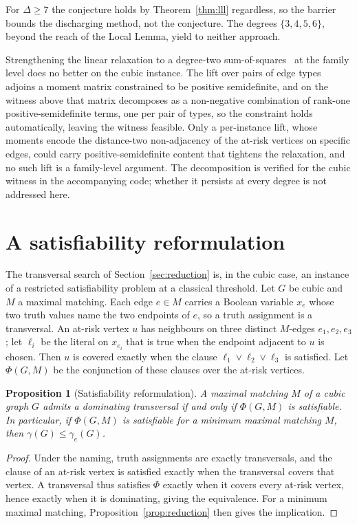 \documentclass[11pt]{article}
\newtheorem{proposition}{Proposition}
\theoremstyle{definition}
\theoremstyle{remark}
\newcommand{\edom}{\gamma_{e}}
\begin{document}
For $\Delta \ge 7$ the conjecture holds by Theorem~\ref{thm:lll} regardless, so
the barrier bounds the discharging method, not the conjecture. The degrees
$\{3, 4, 5, 6\}$, beyond the reach of the Local Lemma, yield to neither approach.

Strengthening the linear relaxation to a degree-two
sum-of-squares~\cite{Lasserre2001,Parrilo2003} at the family level does no better
on the cubic instance. The
lift over pairs of edge types adjoins a moment matrix constrained to be positive
semidefinite, and on the witness above that matrix decomposes as a
non-negative combination of rank-one positive-semidefinite terms, one per pair of
types, so the constraint holds automatically, leaving the witness feasible. Only a
per-instance lift, whose moments encode the distance-two non-adjacency of the
at-risk vertices on specific edges, could carry positive-semidefinite content that
tightens the relaxation, and no such lift is a family-level argument. The
decomposition is verified for the cubic witness in the accompanying code; whether
it persists at every degree is not addressed here.

\section{A satisfiability reformulation}\label{sec:sat}

The transversal search of Section~\ref{sec:reduction} is, in the cubic case, an
instance of a restricted satisfiability problem at a classical threshold. Let $G$
be cubic and $M$ a maximal matching. Each edge $e \in M$ carries a
Boolean variable $x_e$ whose two truth values name the two endpoints of $e$, so a
truth assignment is a transversal. An at-risk vertex $u$ has neighbours on three
distinct $M$-edges $e_1, e_2, e_3$; let $\ell_i$ be the literal on $x_{e_i}$
that is true when the endpoint adjacent to $u$ is chosen. Then $u$ is covered
exactly when the clause $\ell_1 \vee \ell_2 \vee \ell_3$ is satisfied. Let
$\Phi(G,M)$ be the conjunction of these clauses over the at-risk vertices.

\begin{proposition}[Satisfiability reformulation]\label{prop:sat}
A maximal matching $M$ of a cubic graph $G$ admits a dominating transversal if
and only if $\Phi(G,M)$ is satisfiable. In particular, if $\Phi(G,M)$ is
satisfiable for a minimum maximal matching $M$, then $\gamma(G) \le \edom(G)$.
\end{proposition}

\begin{proof}
Under the naming, truth assignments are exactly transversals, and the clause of an
at-risk vertex is satisfied exactly when the transversal covers that vertex. A
transversal thus satisfies $\Phi$ exactly when it covers every at-risk vertex,
hence exactly when it is dominating, giving the equivalence. For a minimum
maximal matching, Proposition~\ref{prop:reduction} then gives the implication.
\end{proof}
\end{document}
